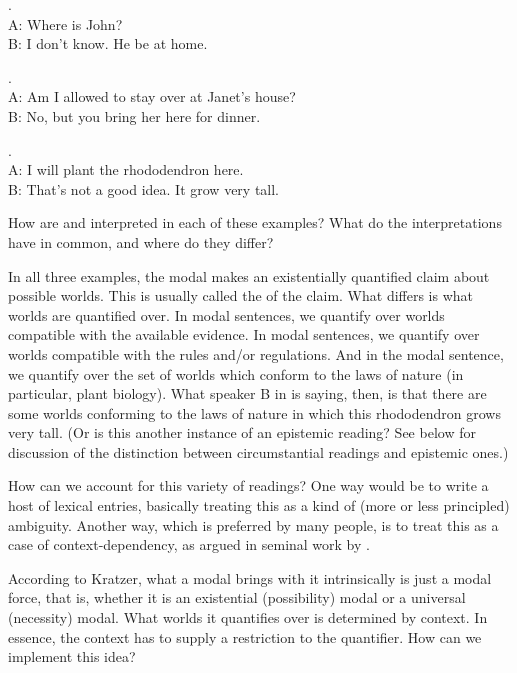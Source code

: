 \ex. \label{epist}\\[6pt]
A: Where is John?\\
B: I don't know. He  be at home.

\ex. \\[6pt]
A: Am I allowed to stay over at Janet's house?\\
B: No, but you  bring her here for dinner.

\ex. \\[6pt]
A: I will plant the rhododendron here.\\
B: That's not a good idea. It  grow very tall.

How are  and  interpreted in each of
these examples? What do the interpretations have in common, and where
do they differ?

In all three examples, the modal makes an existentially quantified
claim about possible worlds. This is usually called the  of the claim. What differs is what worlds are quantified
over. In  modal sentences, we quantify over worlds
compatible with the available evidence. In  modal
sentences, we quantify over worlds compatible with the rules and/or
regulations. And in the  modal sentence, we
quantify over the set of worlds which conform to the laws of nature
(in particular, plant biology). What speaker B in \Last is saying,
then, is that there are some worlds conforming to the laws of nature
in which this rhododendron grows very tall. (Or is this another
instance of an epistemic reading? See below for discussion of the
distinction between circumstantial readings and epistemic ones.)

How can we account for this variety of readings? One way would be to
write a host of lexical entries, basically treating this as a kind of
(more or less principled) ambiguity. Another
way,
which is preferred by many people, is to treat this as a case of
context-dependency, as argued in seminal work by
\citet{kratzer:1977:must-can,kratzer:1978:dissertation,kratzer:1981:notional,kratzer:1991:modality}.

According to
Kratzer, what a modal brings with it intrinsically is just a modal
force, that is, whether it is an existential (possibility) modal or a
universal (necessity) modal. What worlds it quantifies over is
determined by context. In essence, the context has to supply a
restriction to the quantifier. How can we implement this idea?


